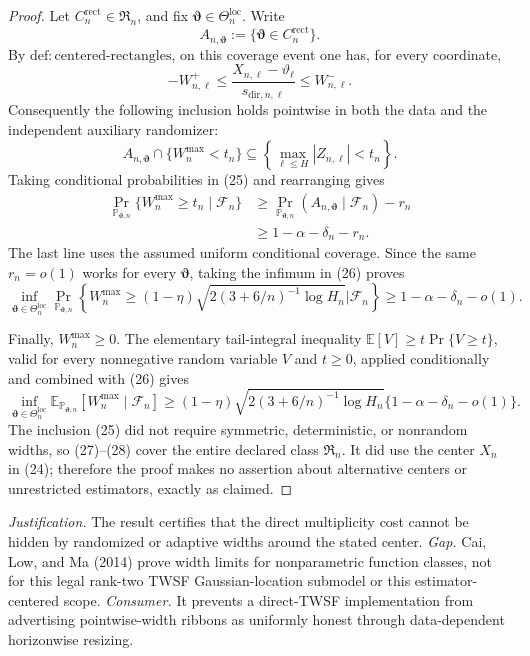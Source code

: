 \documentclass{article}
\begin{document}
\begin{proof}
Let \(C_n^{\mathrm{rect}}\in\mathfrak R_n\), and fix
\(\boldsymbol\vartheta\in\Theta_n^{\mathrm{loc}}\).  Write
\[
 A_{n,\boldsymbol\vartheta}
 :=\{\boldsymbol\vartheta\in C_n^{\mathrm{rect}}\}.
\]
By \(\mathrm{def{:}centered\mbox{-}rectangles}\), on this coverage event one
has, for every coordinate,
\[
 -W^+_{n,\ell}
 \leq \frac{X_{n,\ell}-\vartheta_\ell}{s_{\mathrm{dir},n,\ell}}
 \leq W^-_{n,\ell}.                                        \tag{24}
\]
Consequently the following inclusion holds pointwise in both the data and the
independent auxiliary randomizer:
\[
 A_{n,\boldsymbol\vartheta}\cap\{W_n^{\max}<t_n\}
 \subseteq\left\{\max_{\ell\leq H}|Z_{n,\ell}|<t_n\right\}. \tag{25}
\]
Taking conditional probabilities in (25) and rearranging gives
\[
\begin{aligned}
 \Pr_{\mathbb P_{\boldsymbol\vartheta,n}}
   \{W_n^{\max}\geq t_n\mid\mathcal F_n\}
 &\geq
 \Pr_{\mathbb P_{\boldsymbol\vartheta,n}}
   (A_{n,\boldsymbol\vartheta}\mid\mathcal F_n)-r_n\\
 &\geq1-\alpha-\delta_n-r_n.                               \tag{26}
\end{aligned}
\]
The last line uses the assumed uniform conditional coverage.  Since the same
\(r_n=o(1)\) works for every \(\boldsymbol\vartheta\), taking the infimum in
(26) proves
\[
 \inf_{\boldsymbol\vartheta\in\Theta_n^{\mathrm{loc}}}
 \Pr_{\mathbb P_{\boldsymbol\vartheta,n}}
 \left\{W_n^{\max}\geq
 (1-\eta)\sqrt{2(3+6/n)^{-1}\log H_n}
 \mathrel{\big|}\mathcal F_n\right\}
 \geq1-\alpha-\delta_n-o(1).                               \tag{27}
\]

Finally, \(W_n^{\max}\geq0\).  The elementary tail-integral inequality
\(\mathbb E[V]\geq t\Pr\{V\geq t\}\), valid for every nonnegative random
variable \(V\) and \(t\geq0\), applied conditionally and combined with (26)
gives
\[
 \inf_{\boldsymbol\vartheta\in\Theta_n^{\mathrm{loc}}}
 \mathbb E_{\mathbb P_{\boldsymbol\vartheta,n}}
 [W_n^{\max}\mid\mathcal F_n]
 \geq(1-\eta)\sqrt{2(3+6/n)^{-1}\log H_n}
       \{1-\alpha-\delta_n-o(1)\}.                          \tag{28}
\]
The inclusion (25) did not require symmetric, deterministic, or nonrandom
widths, so (27)--(28) cover the entire declared class \(\mathfrak R_n\).  It
did use the center \(X_n\) in (24); therefore the proof makes no assertion
about alternative centers or unrestricted estimators, exactly as claimed.
\end{proof}
\par\smallskip\noindent \textit{Justification.} The result certifies that the direct multiplicity cost cannot be hidden by randomized or adaptive widths around the stated center. \textit{Gap.} Cai, Low, and Ma (2014) prove width limits for nonparametric function classes, not for this legal rank-two TWSF Gaussian-location submodel or this estimator-centered scope. \textit{Consumer.} It prevents a direct-TWSF implementation from advertising pointwise-width ribbons as uniformly honest through data-dependent horizonwise resizing.
\end{document}
